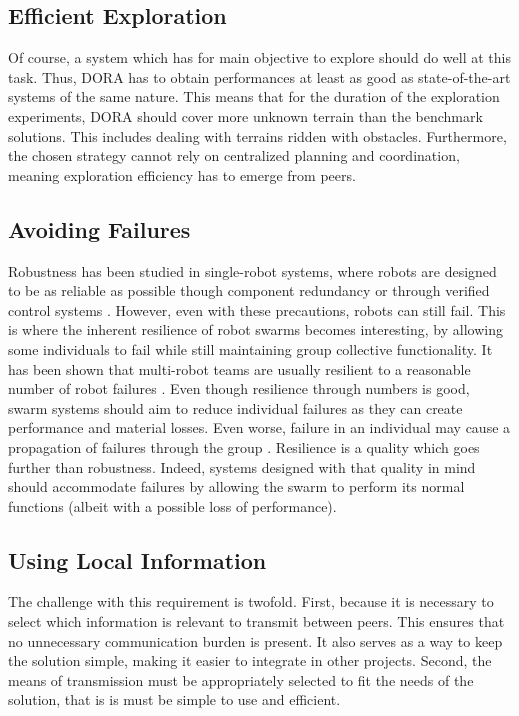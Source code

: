 \subsection{Efficient Exploration}
Of course, a system which has for main objective to explore should do well at this task. Thus, \ac{DORA} has to obtain performances at least as good as state-of-the-art systems of the same nature. This means that for the duration of the exploration experiments, \ac{DORA} should cover more unknown terrain than the benchmark solutions. This includes dealing with terrains ridden with obstacles. Furthermore, the chosen strategy cannot rely on centralized planning and coordination, meaning exploration efficiency has to emerge from peers.

\subsection{Avoiding Failures}
Robustness has been studied in single-robot systems, where robots are designed to be as reliable as possible though component redundancy \cite{brooks1986robust} or through verified control systems \cite{lim1987robust,slotine1985robust,slotine1991applied}. However, even with these precautions, robots can still fail. This is where the inherent resilience of robot swarms becomes interesting, by allowing some individuals to fail while still maintaining group collective functionality. It has been shown that multi-robot teams are usually resilient to a reasonable number of robot failures \cite{ramachandran2019resilience,wehbe2021probabilistic,winfield2006safety}. Even though resilience through numbers is good, swarm systems should aim to reduce individual failures as they can create performance and material losses. Even worse, failure in an individual may cause a propagation of failures through the group \cite{prorok2021beyond}. Resilience is a quality which goes further than robustness. Indeed, systems designed with that quality in mind should accommodate failures by allowing the swarm to perform its normal functions (albeit with a possible loss of performance).

\subsection{Using Local Information}
The challenge with this requirement is twofold. First, because it is necessary to select which information is relevant to transmit between peers. This ensures that no unnecessary communication burden is present. It also serves as a way to keep the solution simple, making it easier to integrate in other projects. Second, the means of transmission must be appropriately selected to fit the needs of the solution, that is is must be simple to use and efficient.

